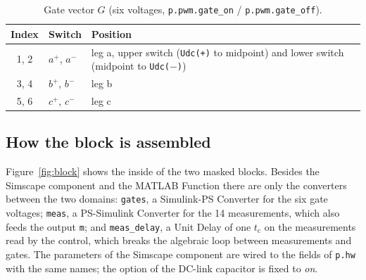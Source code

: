 \documentclass[11pt,a4paper]{scrartcl}
\newcommand{\ped}[1]{_{\mathrm{#1}}}
\newcommand{\code}[1]{\texttt{#1}}
\begin{document}
\begin{onehalfspace}
\begin{table}[H]
	\centering
	\captionsetup{width=0.9\textwidth, font=small}
	\caption[Gate vector of the power stage.]{Gate vector $G$ (six voltages, \code{p.pwm.gate\_on} / \code{p.pwm.gate\_off}).}
	\label{tab:gates}
	\begin{tabularx}{0.95\textwidth}{@{} c l X @{}}
		\toprule
		\textbf{Index} & \textbf{Switch} & \textbf{Position} \\
		\midrule
		1, 2 & $a^{+}$, $a^{-}$ & leg a, upper switch (\code{Udc(+)} to midpoint) and lower switch (midpoint to \code{Udc($-$)}) \\
		3, 4 & $b^{+}$, $b^{-}$ & leg b \\
		5, 6 & $c^{+}$, $c^{-}$ & leg c \\
		\bottomrule
	\end{tabularx}
\end{table}

\subsection{How the block is assembled}
\label{sec:assembly}

Figure~\ref{fig:block} shows the inside of the two masked blocks. Besides the Simscape component and the MATLAB Function there are only the converters between the two domains: \code{gates}, a Simulink-PS Converter for the six gate voltages; \code{meas}, a PS-Simulink Converter for the 14 measurements, which also feeds the output \code{m}; and \code{meas\_delay}, a Unit Delay of one $t\ped{c}$ on the measurements read by the control, which breaks the algebraic loop between measurements and gates. The parameters of the Simscape component are wired to the fields of \code{p.hw} with the same names; the option of the DC-link capacitor is fixed to \emph{on}.


\end{onehalfspace}
\end{document}
